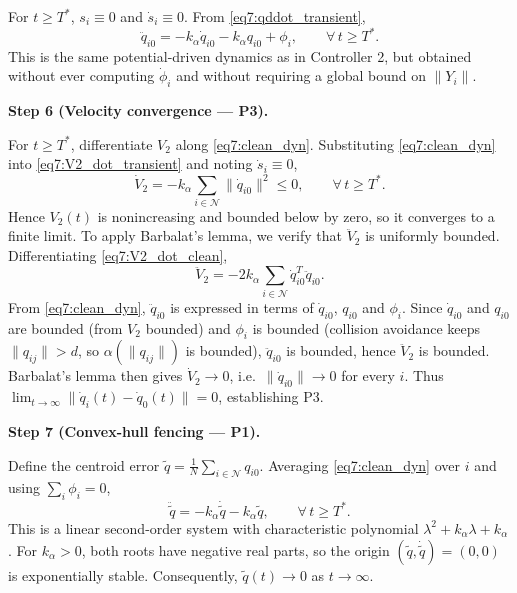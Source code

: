 For $t \ge T^*$, $s_i \equiv 0$ and $\dot{s}_i \equiv 0$.  From \eqref{eq7:qddot_transient},
\begin{equation}
	\ddot{q}_{i0} = -k_\alpha \dot{q}_{i0} - k_\alpha q_{i0} + \phi_i,
	\qquad \forall\, t \ge T^*.
	\label{eq7:clean_dyn}
\end{equation}
This is the same potential-driven dynamics as in Controller 2, but obtained without ever
computing $\dot{\phi}_i$ and without requiring a global bound on $\|Y_i\|$.

\medskip\noindent\textbf{Step 6 (Velocity convergence --- P3).}

For $t \ge T^*$, differentiate $V_2$ along \eqref{eq7:clean_dyn}.  Substituting
\eqref{eq7:clean_dyn} into \eqref{eq7:V2_dot_transient} and noting $\dot{s}_i \equiv 0$,
\begin{equation}
	\dot{V}_2 = -k_\alpha\sum_{i\in\mathcal{N}} \|\dot{q}_{i0}\|^2 \le 0,
	\qquad \forall\, t \ge T^*.
	\label{eq7:V2_dot_clean}
\end{equation}
Hence $V_2(t)$ is nonincreasing and bounded below by zero, so it converges to a finite limit.
To apply Barbalat's lemma, we verify that $\ddot{V}_2$ is uniformly bounded.
Differentiating \eqref{eq7:V2_dot_clean},
\begin{equation}
	\ddot{V}_2 = -2k_\alpha\sum_{i\in\mathcal{N}} \dot{q}_{i0}^T \ddot{q}_{i0}.
\end{equation}
From \eqref{eq7:clean_dyn}, $\ddot{q}_{i0}$ is expressed in terms of $\dot{q}_{i0}$, $q_{i0}$
and $\phi_i$.  Since $\dot{q}_{i0}$ and $q_{i0}$ are bounded (from $V_2$ bounded) and $\phi_i$
is bounded (collision avoidance keeps $\|q_{ij}\| > d$, so $\alpha(\|q_{ij}\|)$ is bounded),
$\ddot{q}_{i0}$ is bounded, hence $\ddot{V}_2$ is bounded.  Barbalat's lemma then gives
$\dot{V}_2 \to 0$, i.e.~$\|\dot{q}_{i0}\| \to 0$ for every $i$.  Thus
$\lim_{t\to\infty} \|\dot{q}_i(t) - \dot{q}_0(t)\| = 0$, establishing P3.

\medskip\noindent\textbf{Step 7 (Convex-hull fencing --- P1).}

Define the centroid error $\tilde{q} = \frac1N\sum_{i\in\mathcal{N}} q_{i0}$.
Averaging \eqref{eq7:clean_dyn} over $i$ and using $\sum_i \phi_i = 0$,
\begin{equation}
	\ddot{\tilde{q}} = -k_\alpha \dot{\tilde{q}} - k_\alpha \tilde{q},
	\qquad \forall\, t \ge T^*.
	\label{eq7:centroid}
\end{equation}
This is a linear second-order system with characteristic polynomial
$\lambda^2 + k_\alpha \lambda + k_\alpha$.  For $k_\alpha > 0$, both roots have negative real
parts, so the origin $(\tilde{q},\dot{\tilde{q}}) = (0,0)$ is exponentially stable.
Consequently, $\tilde{q}(t) \to 0$ as $t \to \infty$.

